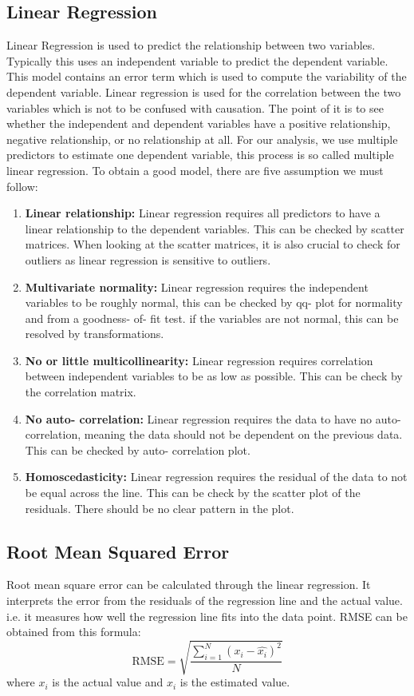 \documentclass[12pt, letterpaper]{article}
\begin{document}
\subsection{Linear Regression}
Linear Regression is used to predict the relationship between two variables. Typically this uses an independent variable to predict the dependent variable. This model contains an error term which is used to compute the variability of the dependent variable. Linear regression is used for the correlation between the two variables which is not to be confused with causation. The point of it is to see whether the independent and dependent variables have a positive relationship, negative relationship, or no relationship at all. For our analysis, we use multiple predictors to estimate one dependent variable, this process is so called multiple linear regression. To obtain a good model, there are five assumption we must follow: 

\begin{enumerate}
    \item \textbf{Linear relationship:} Linear regression requires all predictors to have a linear relationship to the dependent variables. This can be checked by scatter matrices. When looking at the scatter matrices, it is also crucial to check for outliers as linear regression is sensitive to outliers.
    \item \textbf{Multivariate normality:} Linear regression requires the independent variables to be roughly normal, this can be checked by qq- plot for normality and from a goodness- of- fit test. if the variables are not normal, this can be resolved by transformations.
    \item \textbf{No or little multicollinearity:} Linear regression requires correlation between independent variables to be as low as possible. This can be check by the correlation matrix.
    \item \textbf{No auto- correlation:} Linear regression requires the data to have no auto- correlation, meaning the data should not be dependent on the previous data. This can be checked by auto- correlation plot.
    \item \textbf{Homoscedasticity:} Linear regression requires the residual of the data to not be equal across the line. This can be check by the scatter plot of the residuals. There should be no clear pattern in the plot.
\end{enumerate}

\subsection{Root Mean Squared Error}
Root mean square error can be calculated through the linear regression. It interprets the error from the residuals of the regression line and the actual value. i.e. it measures how well the regression line fits into the data point. RMSE can be obtained from this formula: $$ \text{RMSE} = \sqrt{\frac{\sum_{i=1}^{N}(x_i- \hat{x_i})^2}{N}}$$
where $x_i$ is the actual value and $\hat{x_i}$ is the estimated value.
\end{document}
